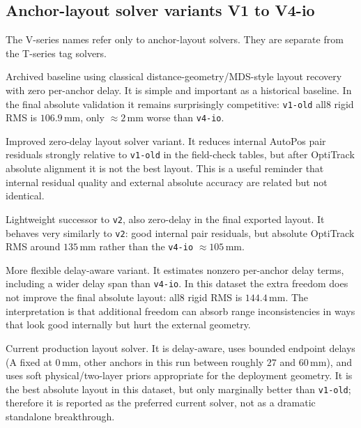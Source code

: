 \documentclass[11pt,a4paper]{article}
\newcommand{\mm}{\,\si{\milli\meter}}
\begin{document}
\subsection{Anchor-layout solver variants V1 to V4-io}
\label{sec:vmethod}
The V-series names refer only to anchor-layout solvers. They are separate from the T-series
tag solvers.

\begin{description}[leftmargin=2.6em,style=nextline]
  \item[\texttt{v1-old}.]
  Archived baseline using classical distance-geometry/MDS-style layout recovery with zero
  per-anchor delay. It is simple and important as a historical baseline. In the final
  absolute validation it remains surprisingly competitive: \texttt{v1-old} all8 rigid RMS
  is $106.9\mm$, only $\approx2\mm$ worse than \texttt{v4-io}.

  \item[\texttt{v2}.]
  Improved zero-delay layout solver variant. It reduces internal AutoPos pair residuals
  strongly relative to \texttt{v1-old} in the field-check tables, but after OptiTrack
  absolute alignment it is not the best layout. This is a useful reminder that internal
  residual quality and external absolute accuracy are related but not identical.

  \item[\texttt{v3-lite}.]
  Lightweight successor to \texttt{v2}, also zero-delay in the final exported layout. It
  behaves very similarly to \texttt{v2}: good internal pair residuals, but absolute
  OptiTrack RMS around $135\mm$ rather than the \texttt{v4-io} $\approx105\mm$.

  \item[\texttt{v3-full}.]
  More flexible delay-aware variant. It estimates nonzero per-anchor delay terms, including
  a wider delay span than \texttt{v4-io}. In this dataset the extra freedom does not improve
  the final absolute layout: all8 rigid RMS is $144.4\mm$. The interpretation is that
  additional freedom can absorb range inconsistencies in ways that look good internally but
  hurt the external geometry.

  \item[\texttt{v4-io}.]
  Current production layout solver. It is delay-aware, uses bounded endpoint delays
  (A fixed at $0\mm$, other anchors in this run between roughly $27$ and $60\mm$), and uses
  soft physical/two-layer priors appropriate for the deployment geometry. It is the best
  absolute layout in this dataset, but only marginally better than \texttt{v1-old};
  therefore it is reported as the preferred current solver, not as a dramatic standalone
  breakthrough.
\end{description}
\end{document}
